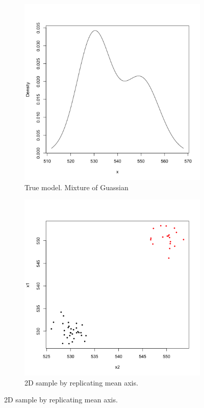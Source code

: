 \documentclass{article}
\begin{document}
\begin{figure}[h!]
    \begin{subfigure}{0.5\textwidth}
        \includegraphics[width=.9\textwidth]{plot_1.png}
        \caption{True model. Mixture of Guassian}
        \label{Mixture of gaussians}
    \end{subfigure}
    \begin{subfigure}{0.5\textwidth}
        \includegraphics[width=.9\textwidth]{plot_2.png}
        \caption{2D sample by replicating mean axis.}
        \label{Mixture of gaussians}
    \end{subfigure}
\end{figure}
\end{document}
